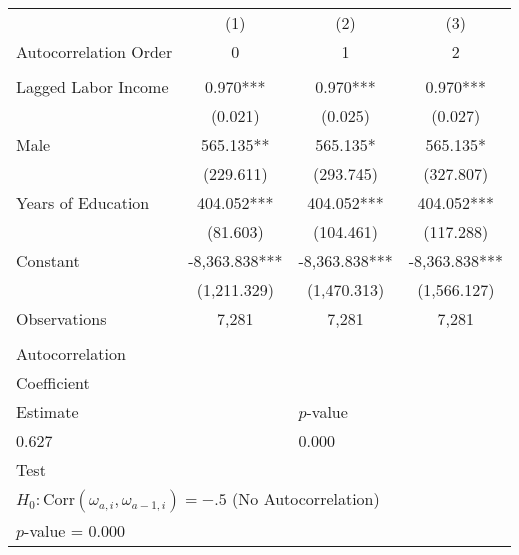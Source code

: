 \begin{tabular}{lccc} \toprule
 & (1) & (2) & (3) \\
Autocorrelation Order & 0 & 1 & 2 \\ \\ \midrule
Lagged Labor Income & 0.970*** & 0.970*** & 0.970*** \\
 & (0.021) & (0.025) & (0.027) \\
Male & 565.135** & 565.135* & 565.135* \\
 & (229.611) & (293.745) & (327.807) \\
Years of Education & 404.052*** & 404.052*** & 404.052*** \\
 & (81.603) & (104.461) & (117.288) \\
Constant & -8,363.838*** & -8,363.838*** & -8,363.838*** \\
 & (1,211.329) & (1,470.313) & (1,566.127) \\ 
 Observations & 7,281 & 7,281 & 7,281 \\ \\ \midrule
 \multicolumn{4}{l}{Autocorrelation} \\
 \multicolumn{4}{l}{Coefficient} \\
 \multicolumn{2}{l}{Estimate} & \multicolumn{2}{l}{$p$-value} \\ 
 \multicolumn{2}{l}{0.627} & \multicolumn{2}{l}{0.000} \\  
 \multicolumn{4}{l}{Test} \\ 
  \multicolumn{4}{l}{$H_{0}: \text{Corr} \left( \omega_{a,i}, \omega_{a-1,i} \right) = -.5$ (No Autocorrelation)} \\
  \multicolumn{4}{l}{$p$-value = 0.000} \\
\end{tabular}
